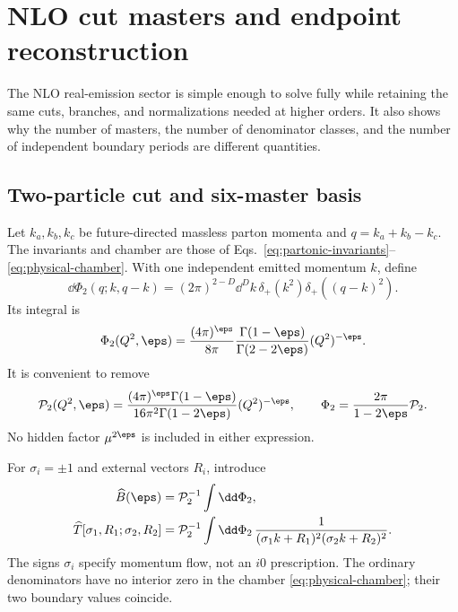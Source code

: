 \section{NLO cut masters and endpoint reconstruction}
\label{sec:nlo-example}

The NLO real-emission sector is simple enough to solve fully while retaining
the same cuts, branches, and normalizations needed at higher orders.  It also
shows why the number of masters, the number of denominator classes, and the
number of independent boundary periods are different quantities.

\subsection{Two-particle cut and six-master basis}

Let $k_a,k_b,k_c$ be future-directed massless parton momenta and
$q=k_a+k_b-k_c$.  The invariants and chamber are those of
Eqs.~\eqref{eq:partonic-invariants}--\eqref{eq:physical-chamber}.  With one
independent emitted momentum $k$, define
\begin{equation}
 \dd\Phi_2(q;k,q-k)
 =(2\pi)^{2-D}\dd^Dk\,
 \delta_+(k^2)\delta_+((q-k)^2).
 \label{eq:nlo-two-body-measure}
\end{equation}
Its integral is
\begin{equation}
 \Phi_2(Q^2,\eps)
 =\frac{(4\pi)^\eps}{8\pi}
  \frac{\Gamma(1-\eps)}{\Gamma(2-2\eps)}(Q^2)^{-\eps}.
 \label{eq:nlo-two-body-volume}
\end{equation}
It is convenient to remove
\begin{equation}
 \mathcal P_2(Q^2,\eps)
 =\frac{(4\pi)^\eps\Gamma(1-\eps)}
        {16\pi^2\Gamma(1-2\eps)}(Q^2)^{-\eps},
 \qquad
 \Phi_2=\frac{2\pi}{1-2\eps}\mathcal P_2.
 \label{eq:nlo-reduced-phase-space-factor}
\end{equation}
No hidden factor $\mu^{2\eps}$ is included in either expression.

For $\sigma_i=\pm1$ and external vectors $R_i$, introduce
\begin{align}
 \widehat B(\eps)
 &=\mathcal P_2^{-1}\int\dd\Phi_2,
 \label{eq:nlo-bubble-definition}\\
 \widehat T[\sigma_1,R_1;\sigma_2,R_2]
 &=\mathcal P_2^{-1}\int\dd\Phi_2\,
 \frac{1}{(\sigma_1k+R_1)^2(\sigma_2k+R_2)^2}.
 \label{eq:nlo-top-definition}
\end{align}
The signs $\sigma_i$ specify momentum flow, not an $i0$ prescription.
The ordinary denominators have no interior zero in the chamber
\eqref{eq:physical-chamber}; their two boundary values coincide.

